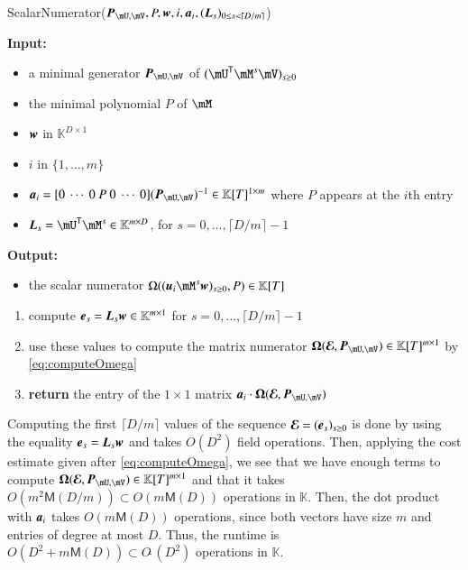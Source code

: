 \documentclass[final,1p,times,authoryear]{elsarticle}
\newcommand{\mat}[1]{\bm{\MakeUppercase{#1}}} %
\newcommand{\row}[1]{\bm{\MakeLowercase{#1}}} %
\newcommand{\col}[1]{\bm{\MakeLowercase{#1}}} %
\newcommand{\softO}[1]{O{\tilde{~}}(#1)} %
\newcommand{\minpoly}{P}
\newcommand{\trsp}[1]{#1^{\mathsf{T}}} %
\def\M {\ensuremath{\mathsf{M}}}
\def\K{\mathbb{K}}
\def\K {\ensuremath{\mathbb{K}}}
\newcommand{\mUt}{\trsp{\mU}}
\begin{document}
\begin{algorithm}[H]
  \caption{{\sf ScalarNumerator}($\mat{P}_{\mU,\mV}, \minpoly, \row{w}, i, \row{a}_i,(\mat{L}_s)_{0 \le s < \lceil D/m\rceil}$)}
  {\bf Input:} \vspace{-0.5em}
  \begin{itemize}
    \item a minimal generator $\mat{P}_{\mU,\mV}$ of $(\mUt \mM^s \mV)_{s \ge 0}$
    \item the minimal polynomial $P$ of $\mM$
    \item $\row{w}$ in $\K^{D \times 1}$
    \item $i$ in $\{1,\dots,m\}$
    \item $\row{a}_i =  [0~\cdots~0~\minpoly~0~\cdots~0]  (\mat{P}_{\mU,\mV})^{-1} \in \K[T]^{1\times m}$
      where $\minpoly$ appears at the $i$th entry
    \item $\mat{L}_s = \mUt \mM^s \in \K^{m\times D}$, for $s=0,\dots,\lceil D/m\rceil-1$
  \end{itemize}
  {\bf Output:}  \vspace{-0.5em}
  \begin{itemize}
    \item         the scalar numerator $\Omega((\row{u}_i \mM^s \col{w})_{s \ge 0}, \minpoly) \in \K[T]$
  \end{itemize}
  \begin{enumerate}
    \item compute $\col{E}_s = \mat{L}_s \col{w} \in \K^{m \times 1}$ for $s=0,\dots,\lceil D/m\rceil-1$
    \item use these values to compute the matrix numerator $ \mat{\Omega}(\mat{\mathcal{E}}, \mat{P}_{\mU,\mV}) \in \K[T]^{m \times 1}$ 
      by \cref{eq:computeOmega}
    \item {\bf return} the entry of the $1 \times 1$ matrix $\row{a}_i\cdot  \mat{\Omega}(\mat{\mathcal{E}}, \mat{P}_{\mU,\mV})$ 
  \end{enumerate}
  \label{algo:scalar_numerator}
\end{algorithm}

Computing the first $\lceil D/m \rceil$ values of the sequence
$\mat{\mathcal{E}}=(\col{e}_s)_{s \ge 0}$ is done by using the
equality $\col{E}_s = \mat{L}_s \col{w}$ and takes $O(D^2)$ field
operations. Then, applying the cost estimate given after
\cref{eq:computeOmega}, we see that we have enough terms to compute
$\mat{\Omega}(\mat{\mathcal{E}}, \mat{P}_{\mU,\mV}) \in \K[T]^{m
\times 1}$ and that it takes $O(m^2 \M(D/m)) \subset O(m \M(D))$ operations in
$\K$. Then, the dot product with $\row{a}_i$ takes $O(m \M(D))$
operations, since both vectors have size $m$ and entries of degree at
most $D$. Thus, the runtime is 
\(O(D^2 + m \M(D)) \subset \softO{D^2}\)
operations in $\K$.
\end{document}
